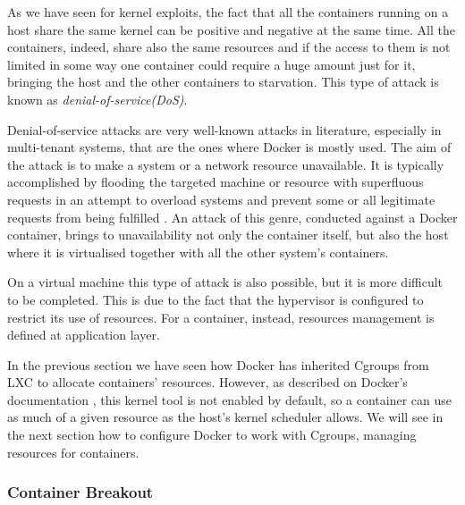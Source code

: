 \documentclass[a4paper,12pt]{article}
\begin{document}
As we have seen for kernel exploits, the fact that all the containers running on
a host share the same kernel can be positive and negative at the same time. All
the containers, indeed, share also the same resources and if the access to them
is not limited in some way one container could require a huge amount just for
it, bringing the host and the other containers to starvation. This type of
attack is known as \textit{denial-of-service(DoS)}.\par Denial-of-service
attacks are very well-known attacks in literature, especially in multi-tenant
systems, that are the ones where Docker is mostly used.  The aim of the attack
is to make a system or a network resource unavailable. It is typically
accomplished by flooding the targeted machine or resource with superfluous
requests in an attempt to overload systems and prevent some or all legitimate
requests from being fulfilled \cite{dos_wikipedia}. An attack of this genre,
conducted against a Docker container, brings to unavailability not only the
container itself, but also the host where it is virtualised together with all
the other system's containers.\par On a virtual machine this type of attack is
also possible, but it is more difficult to be completed. This is due to the fact
that the hypervisor is configured to restrict its use of resources. For a
container, instead, resources management is defined at application layer.\par
In the previous section we have seen how Docker has inherited Cgroups from LXC
to allocate containers' resources. However, as described on Docker's
documentation \cite{resource_on_docker}, this kernel tool is not enabled by
default, so a container can use as much of a given resource as the host's kernel
scheduler allows. We will see in the next section how to configure Docker to
work with Cgroups, managing resources for containers. 


\subsubsection{Container Breakout}
\end{document}
